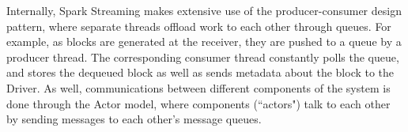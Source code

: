 Internally, Spark Streaming makes extensive use of the producer-consumer design pattern, where separate threads offload work to each other through queues. For example, as blocks are generated at the receiver, they are pushed to a queue by a producer thread. The corresponding consumer thread constantly polls the queue, and stores the dequeued block as well as sends metadata about the block to the Driver. As well, communications between different components of the system is done through the Actor model, where components (``actors") talk to each other by sending messages to each other's message queues.